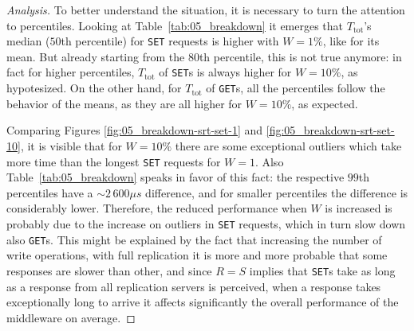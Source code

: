 \documentclass[11pt]{article}
\theoremstyle{definition}
\newenvironment{ana}[1][\proofname]{\begin{proof}[Analysis]}{\end{proof}}
\newcommand\Ttot{T_{\mathrm{tot}}}
\renewcommand\t\texttt
\begin{document}
\begin{ana}
    To better understand the situation, it is necessary to turn the attention to percentiles.
    Looking at Table~\ref{tab:05_breakdown} it emerges that $\Ttot$'s median ($50$th percentile) for \t{SET} requests is higher with $W=1\%$, like for its mean.
    But already starting from the $80$th percentile, this is not true anymore: in fact for higher percentiles, $\Ttot$ of \t{SET}s is always higher for $W=10\%$, as hypotesized.
    On the other hand, for $\Ttot$ of \t{GET}s, all the percentiles follow the behavior of the means, as they are all higher for $W=10\%$, as expected.
    
    Comparing Figures \ref{fig:05_breakdown-srt-set-1} and \ref{fig:05_breakdown-srt-set-10}, it is visible that for $W=10\%$ there are some exceptional outliers which take more time than the longest \t{SET} requests for $W=1$.
    Also Table~\ref{tab:05_breakdown} speaks in favor of this fact: the respective $99$th percentiles have a $\sim2\,600\mu s$ difference, and for smaller percentiles the difference is considerably lower.
    Therefore, the reduced performance when $W$ is increased is probably due to the increase on outliers in \t{SET} requests, which in turn slow down also \t{GET}s.
    This might be explained by the fact that increasing the number of write operations, with full replication it is more and more probable that some responses are slower than other, and since $R=S$ implies that \t{SET}s take as long as a response from all replication servers is perceived, when a response takes exceptionally long to arrive it affects significantly the overall performance of the middleware on average.
\end{ana}
\end{document}
